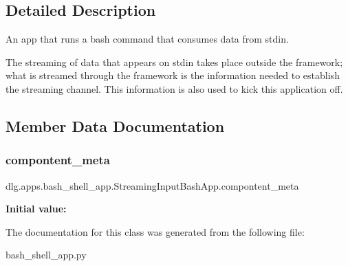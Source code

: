 \subsection{Detailed Description}
\begin{DoxyVerb}An app that runs a bash command that consumes data from stdin.

The streaming of data that appears on stdin takes place outside the
framework; what is streamed through the framework is the information needed
to establish the streaming channel. This information is also used to kick
this application off.
\end{DoxyVerb}
 

\subsection{Member Data Documentation}
\mbox{\label{classdlg_1_1apps_1_1bash__shell__app_1_1_streaming_input_bash_app_a63062e31fd1870b787cb1301a3a59aef}} 
\subsubsection{\texorpdfstring{compontent\_meta}{compontent\_meta}}
{\footnotesize\ttfamily dlg.\+apps.\+bash\+\_\+shell\+\_\+app.\+Streaming\+Input\+Bash\+App.\+compontent\+\_\+meta\hspace{0.3cm}{\ttfamily [static]}}

{\bfseries Initial value\+:}
\begin{DoxyCode}{0}

\end{DoxyCode}


The documentation for this class was generated from the following file\+:\begin{DoxyCompactItemize}
\item 
bash\+\_\+shell\+\_\+app.\+py\end{DoxyCompactItemize}
